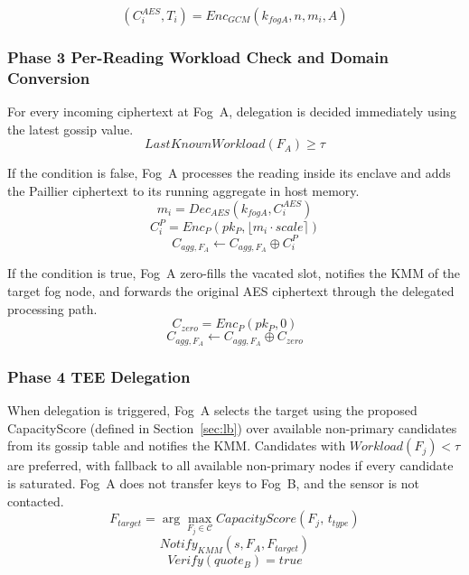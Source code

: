 \documentclass[conference]{IEEEtran}
\begin{document}
    \begin{equation}
    (C_i^{AES},T_i) = Enc_{GCM}(k_{fogA}, n, m_i, A)
    \end{equation}

    \subsubsection{\textbf{Phase 3 Per-Reading Workload Check and Domain Conversion}}

    For every incoming ciphertext at Fog~A, delegation is decided immediately using the latest gossip value.
    \begin{equation}
    LastKnownWorkload(F_A) \geq \tau
    \end{equation}

    If the condition is false, Fog~A processes the reading inside its enclave and adds the Paillier ciphertext to its running aggregate in host memory.
    \begin{equation}
    m_i = Dec_{AES}(k_{fogA}, C_i^{AES})
    \end{equation}
    \begin{equation}
    C_i^P = Enc_P(pk_P, \lfloor m_i \cdot scale \rceil)
    \end{equation}
    \begin{equation}
    C_{agg,F_A} \leftarrow C_{agg,F_A} \oplus C_i^P
    \end{equation}

    If the condition is true, Fog~A zero-fills the vacated slot, notifies the KMM of the target fog node, and forwards the original AES ciphertext through the delegated processing path.
    \begin{equation}
    C_{zero} = Enc_P(pk_P,0)
    \end{equation}
    \begin{equation}
    C_{agg,F_A} \leftarrow C_{agg,F_A} \oplus C_{zero}
    \end{equation}

    \subsubsection{\textbf{Phase 4 TEE Delegation}}

    When delegation is triggered, Fog~A selects the target using the proposed CapacityScore (defined in Section~\ref{sec:lb}) over available non-primary candidates from its gossip table and notifies the KMM\@. Candidates with $Workload(F_j)<\tau$ are preferred, with fallback to all available non-primary nodes if every candidate is saturated. Fog~A does not transfer keys to Fog~B, and the sensor is not contacted.
    \begin{equation}
    F_{target}=\arg\max_{F_j\in\mathcal{C}} CapacityScore(F_j,\,t_{type})
    \end{equation}
    \begin{equation}
    Notify_{KMM}(s,F_A,F_{target})
    \end{equation}
    \begin{equation}
    Verify(quote_B)=true
    \end{equation}
\end{document}
